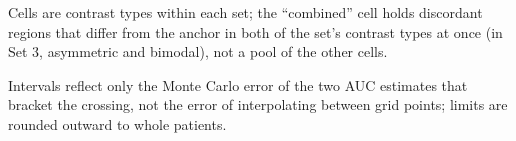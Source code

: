 \documentclass[AMA,Times1COL]{WileyNJDv5}
\begin{document}
\begin{table}[ht]
\centering
\caption{Per-region sample size at which selection AUC reaches 0.9, by cell and measure, interpolated on $\log n$ over the grid $n = 25$--2{,}000, with 95\% Monte Carlo (MC) intervals from the delta method applied to the log-$n$ interpolation. Cells whose AUC stays at chance (--) across the full grid are marked ``blind''; $\leq 25$ marks a target reached at the smallest grid size, where no interval is available.\label{tab:study2_required_n_mc}}%
\begin{tablenotes}
\item Cells are contrast types within each set; the ``combined'' cell holds discordant regions that differ from the anchor in both of the set's contrast types at once (in Set 3, asymmetric and bimodal), not a pool of the other cells.
\item Intervals reflect only the Monte Carlo error of the two AUC estimates that bracket the crossing, not the error of interpolating between grid points; limits are rounded outward to whole patients.
\end{tablenotes}
\end{table}
\end{document}
